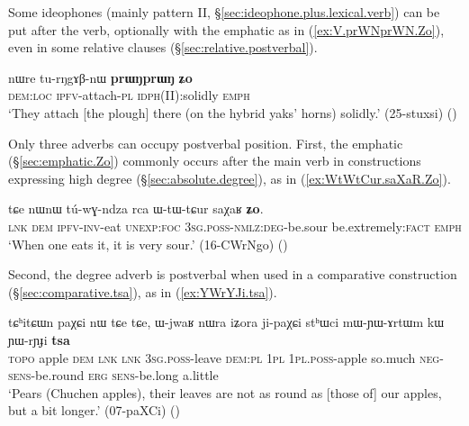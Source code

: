 Some ideophones (mainly pattern II, §\ref{sec:ideophone.plus.lexical.verb}) can be put after the verb, optionally with  the emphatic  as in (\ref{ex:V.prWNprWN.Zo}), even in some relative clauses (§\ref{sec:relative.postverbal}).

\begin{exe}
\ex \label{ex:V.prWNprWN.Zo}
\gll nɯre tu-rŋgɤβ-nɯ \textbf{prɯŋprɯŋ} \textbf{ʑo} \\
\textsc{dem}:\textsc{loc} \textsc{ipfv}-attach-\textsc{pl} \textsc{idph}(II):solidly \textsc{emph} \\
\glt `They attach [the plough] there (on the hybrid yaks' horns) solidly.' (25-stuxsi)
()
\end{exe}

Only three adverbs can occupy postverbal position. First, the emphatic  (§\ref{sec:emphatic.Zo}) commonly occurs after the main verb in constructions expressing high degree (§\ref{sec:absolute.degree}), as in (\ref{ex:WtWtCur.saXaR.Zo}).

\begin{exe}
\ex \label{ex:WtWtCur.saXaR.Zo}
\gll  tɕe nɯnɯ tú-wɣ-ndza rca ɯ-tɯ-tɕur saχaʁ \textbf{ʑo}. \\
\textsc{lnk} \textsc{dem} \textsc{ipfv}-\textsc{inv}-eat \textsc{unexp}:\textsc{foc} \textsc{3sg}.\textsc{poss}-\textsc{nmlz}:\textsc{deg}-be.sour be.extremely:\textsc{fact} \textsc{emph} \\
\glt `When one eats it, it is very sour.' (16-CWrNgo)
()
\end{exe}

Second, the degree adverb  is postverbal when used in a comparative construction (§\ref{sec:comparative.tsa}), as in (\ref{ex:YWrYJi.tsa}).

\begin{exe}
\ex \label{ex:YWrYJi.tsa}
\gll tɕʰitɕɯn paχɕi nɯ tɕe tɕe, ɯ-jwaʁ nɯra iʑora ji-paχɕi stʰɯci mɯ-ɲɯ-ɤrtɯm kɯ ɲɯ-rɲɟi \textbf{tsa} \\
\textsc{topo} apple \textsc{dem} \textsc{lnk} \textsc{lnk} \textsc{3sg}.\textsc{poss}-leave \textsc{dem}:\textsc{pl} \textsc{1pl} \textsc{1pl}.\textsc{poss}-apple so.much \textsc{neg}-\textsc{sens}-be.round \textsc{erg} \textsc{sens}-be.long a.little \\
\glt `Pears (Chuchen apples), their leaves are not as round as [those of] our apples, but a bit longer.' (07-paXCi)
()
\end{exe}

